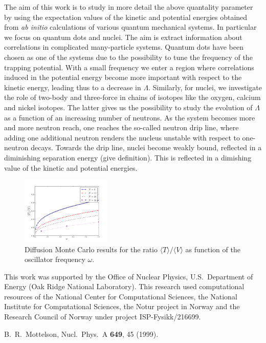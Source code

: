 \documentclass[prl,twocolumn,superscriptaddress,showpacs,floatfix]{revtex4}
\begin{document}
The aim of this work is to study in more detail the above quantality
parameter by using the expectation values of the kinetic and potential
energies obtained from {\em ab initio} calculations of various quantum
mechanical systems. In particular we focus on quantum dots and
nuclei. The aim is extract information about correlations in
complicated many-particle systems. Quantum dots have been chosen as
one of the systems due to the possibility to tune the frequency of the
trapping potential. With a small frequency we enter a region where
correlations induced in the potential energy become more important
with respect to the kinetic energy, leading thus to a decrease in
$\Lambda$. Similarly, for nuclei, we investigate the role of two-body
and three-force in chains of isotopes like the oxygen, calcium and
nickel isotopes. The latter gives us the possibility to study the
evolution of $\Lambda$ as a function of an increasing number of
neutrons.  As the system becomes more and more neutron reach, one
reaches the so-called neutron drip line, where adding one additional
neutron renders the nucleus unstable with respect to one-neutron decays. 
Towards the drip line, nuclei become weakly bound, reflected in a diminishing
separation energy (give definition). This is reflected in a dimishing value of the kinetic and potential energies. 
\begin{figure}%
     \begin{center}
            \includegraphics[width=0.38\textwidth]{figures/qdots.pdf}
    \end{center}
    \caption{Diffusion Monte Carlo results for the ratio $\langle T \rangle/\langle V\rangle$ as function of 
the oscillator frequency $\omega$.}
   \label{fig:qdots}
\end{figure}


\begin{acknowledgments}
  This work was supported by the Office of Nuclear Physics,
  U.S.~Department of Energy (Oak Ridge National Laboratory). This research used computational resources of the
  National Center for Computational Sciences, the National Institute
  for Computational Sciences, the Notur project in Norway and the Research Council of Norway under project ISP-Fysikk/216699. 
\end{acknowledgments}




\begin{thebibliography}{99}

 B.~R.~Mottelson, Nucl.~Phys.~A {\bf 649}, 45 (1999).


\end{thebibliography}
\end{document}
